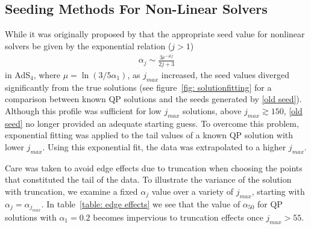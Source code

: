 \documentclass[../PhD.tex]{subfiles}
\begin{document}

\begin{subappendices}


\section{Seeding Methods For Non-Linear Solvers}
\label{app: seeding}
While it was originally proposed by \cite{1507.08261} that the appropriate seed value for nonlinear solvers be given by the exponential relation ($j > 1$)
\begin{align}
\label{old seed}
\alpha_j \sim \frac{3 e^{-\mu j}}{2j + 3}
\end{align}
in AdS$_4$, where $\mu = \ln (3 / 5 \alpha_1 )$, as $j_{max}$ increased, the seed values diverged significantly from the true solutions (see figure~\ref{fig: solutionfitting} for a comparison between known QP solutions and the seeds generated by \eqref{old seed}). Although this profile was sufficient for low $j_{max}$ solutions, above $j_{max} \gtrsim 150$, \eqref{old seed} no longer provided an adequate starting guess. To overcome this problem, exponential fitting was applied to the tail values of a known QP solution with lower $j_{max}$. Using this exponential fit, the data was extrapolated to a higher $j_{max}$. 

Care was taken to avoid edge effects due to truncation when choosing the points that constituted the tail of the data. To illustrate the variance of the solution with truncation, we examine a fixed $\alpha_j$ value over a variety of $j_{max}$, starting with $\alpha_j = \alpha_{j_{max}}$. In table~\ref{table: edge effects} we see that the value of $\alpha_{50}$ for QP solutions with $\alpha_1 = 0.2$ becomes impervious to truncation effects once $j_{max} > 55$. 


\end{subappendices}
\end{document}
